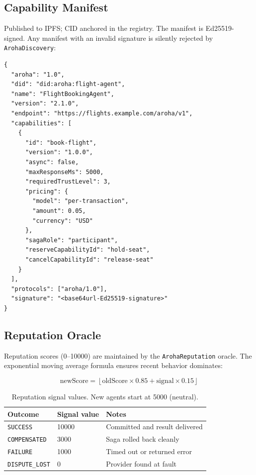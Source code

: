 \documentclass[11pt,a4paper]{article}
\begin{document}
\subsection{Capability Manifest}

Published to IPFS; CID anchored in the registry. The manifest is Ed25519-signed.
Any manifest with an invalid signature is silently rejected by \texttt{ArohaDiscovery}:

\begin{lstlisting}[caption=Capability manifest format]
{
  "aroha": "1.0",
  "did": "did:aroha:flight-agent",
  "name": "FlightBookingAgent",
  "version": "2.1.0",
  "endpoint": "https://flights.example.com/aroha/v1",
  "capabilities": [
    {
      "id": "book-flight",
      "version": "1.0.0",
      "async": false,
      "maxResponseMs": 5000,
      "requiredTrustLevel": 3,
      "pricing": {
        "model": "per-transaction",
        "amount": 0.05,
        "currency": "USD"
      },
      "sagaRole": "participant",
      "reserveCapabilityId": "hold-seat",
      "cancelCapabilityId": "release-seat"
    }
  ],
  "protocols": ["aroha/1.0"],
  "signature": "<base64url-Ed25519-signature>"
}
\end{lstlisting}

\subsection{Reputation Oracle}

Reputation scores (0--10000) are maintained by the \texttt{ArohaReputation} oracle.
The exponential moving average formula ensures recent behavior dominates:

\[
  \text{newScore} = \left\lfloor \text{oldScore} \times 0.85 + \text{signal} \times 0.15 \right\rfloor
\]

\begin{table}[ht]
  \centering
  \renewcommand{\arraystretch}{1.3}
  \begin{tabularx}{\textwidth}{@{} l l X @{}}
    \toprule
    \textbf{Outcome} & \textbf{Signal value} & \textbf{Notes} \\
    \midrule
    \texttt{SUCCESS}        & 10000 & Committed and result delivered \\
    \texttt{COMPENSATED}    &  3000 & Saga rolled back cleanly \\
    \texttt{FAILURE}        &  1000 & Timed out or returned error \\
    \texttt{DISPUTE\_LOST}  &     0 & Provider found at fault \\
    \bottomrule
  \end{tabularx}
  \caption{Reputation signal values. New agents start at 5000 (neutral).}
\end{table}
\end{document}
